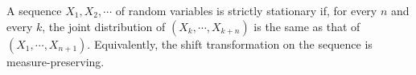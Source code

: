 A sequence $X_1, X_2, \cdots$ of random variables is strictly stationary if, for every $n$ and every $k$, the joint distribution of $(X_k, \cdots, X_{k+n})$ is the same as that of $(X_1, \cdots, X_{n+1})$. Equivalently, the shift transformation on the sequence is measure-preserving.
